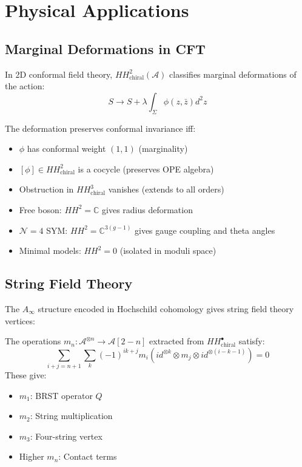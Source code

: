 \section{Physical Applications}

\subsection{Marginal Deformations in CFT}

In 2D conformal field theory, $HH^2_{\text{chiral}}(\mathcal{A})$ classifies marginal deformations of the action:
\[
S \to S + \lambda \int_{\Sigma} \phi(z,\bar{z}) d^2z
\]

The deformation preserves conformal invariance iff:
\begin{itemize}
\item $\phi$ has conformal weight $(1,1)$ (marginality)
\item $[\phi] \in HH^2_{\text{chiral}}$ is a cocycle (preserves OPE algebra)
\item Obstruction in $HH^3_{\text{chiral}}$ vanishes (extends to all orders)
\end{itemize}

\begin{example}
\begin{itemize}
\item Free boson: $HH^2 = \mathbb{C}$ gives radius deformation
\item $\mathcal{N}=4$ SYM: $HH^2 = \mathbb{C}^{3(g-1)}$ gives gauge coupling and theta angles
\item Minimal models: $HH^2 = 0$ (isolated in moduli space)
\end{itemize}
\end{example}

\subsection{String Field Theory}

The $A_{\infty}$ structure encoded in Hochschild cohomology gives string field theory vertices:

\begin{theorem}
The operations $m_n: \mathcal{A}^{\otimes n} \to \mathcal{A}[2-n]$ extracted from $HH^{\bullet}_{\text{chiral}}$ satisfy:
\[
\sum_{i+j=n+1} \sum_{k} (-1)^{ik+j} m_i(id^{\otimes k} \otimes m_j \otimes id^{\otimes(i-k-1)}) = 0
\]
These give:
\begin{itemize}
\item $m_1$: BRST operator $Q$
\item $m_2$: String multiplication
\item $m_3$: Four-string vertex
\item Higher $m_n$: Contact terms
\end{itemize}
\end{theorem}

